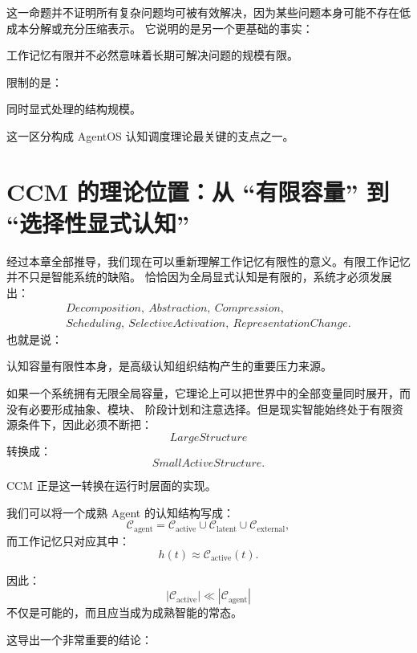 这一命题并不证明所有复杂问题均可被有效解决，因为某些问题本身可能不存在低成本分解或充分压缩表示。
它说明的是另一个更基础的事实：
\begin{statementbox}
工作记忆有限并不必然意味着长期可解决问题的规模有限。
\end{statementbox}
限制的是：
\begin{statementbox}
同时显式处理的结构规模。
\end{statementbox}

这一区分构成 AgentOS 认知调度理论最关键的支点之一。


\section{CCM 的理论位置：从 ``有限容量'' 到 ``选择性显式认知''}

经过本章全部推导，我们现在可以重新理解工作记忆有限性的意义。有限工作记忆并不只是智能系统的缺陷。
恰恰因为全局显式认知是有限的，系统才必须发展出：
\[
\begin{gathered}
Decomposition,\ Abstraction,\ Compression,\\
Scheduling,\ SelectiveActivation,\ RepresentationChange.
\end{gathered}
\]
也就是说：
\begin{statementbox}
认知容量有限性本身，是高级认知组织结构产生的重要压力来源。
\end{statementbox}

如果一个系统拥有无限全局容量，它理论上可以把世界中的全部变量同时展开，而没有必要形成抽象、模块、
阶段计划和注意选择。但是现实智能始终处于有限资源条件下，因此必须不断把：
\[
LargeStructure
\]
转换成：
\[
SmallActiveStructure.
\]

CCM 正是这一转换在运行时层面的实现。

我们可以将一个成熟 Agent 的认知结构写成：
\[
\mathcal C_{\mathrm{agent}}
=
\mathcal C_{\mathrm{active}}
\cup
\mathcal C_{\mathrm{latent}}
\cup
\mathcal C_{\mathrm{external}},
\]
而工作记忆只对应其中：
\[
h(t)
\approx
\mathcal C_{\mathrm{active}}(t).
\]

因此：
\[
\boxed{
|\mathcal C_{\mathrm{active}}|
\ll
|\mathcal C_{\mathrm{agent}}|
}
\]
不仅是可能的，而且应当成为成熟智能的常态。

这导出一个非常重要的结论：
\begin{statementbox}
\centering
{}
\end{statementbox}

